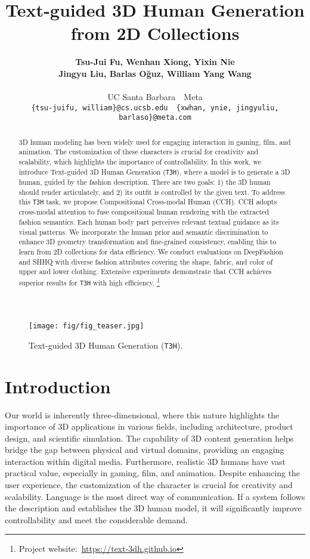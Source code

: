 \documentclass[11pt]{article}
\title{Text-guided 3D Human Generation from 2D Collections}
\author{\textbf{Tsu-Jui Fu, Wenhan Xiong, Yixin Nie}\\\textbf{Jingyu Liu, Barlas Oğuz, William Yang Wang}\\ \\UC Santa Barbara~~Meta\\{\tt \small \{tsu-juifu, william\}@cs.ucsb.edu~~\{xwhan, ynie, jingyuliu, barlaso\}@meta.com}}
\newcommand \blfootnote[1]{
    \begingroup
        \renewcommand \thefootnote{}\footnote{#1}
        \addtocounter{footnote}{-1}
        \vspace{-1ex}
    \endgroup
}
\begin{document}
\maketitle
\setlength{\abovedisplayskip}{5pt} \setlength{\belowdisplayskip}{5pt}

\begin{abstract}
3D human modeling has been widely used for engaging interaction in gaming, film, and animation. The customization of these characters is crucial for creativity and scalability, which highlights the importance of controllability. In this work, we introduce Text-guided 3D Human Generation (\texttt{T3H}), where a model is to generate a 3D human, guided by the fashion description. There are two goals: 1) the 3D human should render articulately, and 2) its outfit is controlled by the given text. To address this \texttt{T3H} task, we propose Compositional Cross-modal Human (CCH). CCH adopts cross-modal attention to fuse compositional human rendering with the extracted fashion semantics. Each human body part perceives relevant textual guidance as its visual patterns. We incorporate the human prior and semantic discrimination to enhance 3D geometry transformation and fine-grained consistency, enabling this to learn from 2D collections for data efficiency. We conduct evaluations on DeepFashion and SHHQ with diverse fashion attributes covering the shape, fabric, and color of upper and lower clothing. Extensive experiments demonstrate that CCH achieves superior results for \texttt{T3H} with high efficiency.\blfootnote{Project website:~\url{https://text-3dh.github.io}}
\end{abstract}

\begin{figure}[t]
\centering
    \texttt{[image: fig/fig\_teaser.jpg]}
    \vspace{-3.5ex}
    \caption{Text-guided 3D Human Generation (\texttt{T3H}).}
    \vspace{-2ex}
    \label{fig:teaser}
\end{figure}

\section{Introduction}
Our world is inherently three-dimensional, where this nature highlights the importance of 3D applications in various fields, including architecture, product design, and scientific simulation. The capability of 3D content generation helps bridge the gap between physical and virtual domains, providing an engaging interaction within digital media. Furthermore, realistic 3D humans have vast practical value, especially in gaming, film, and animation. Despite enhancing the user experience, the customization of the character is crucial for creativity and scalability. Language is the most direct way of communication. If a system follows the description and establishes the 3D human model, it will significantly improve controllability and meet the considerable demand.
\end{document}
